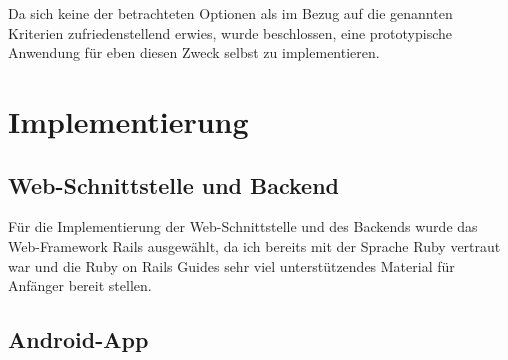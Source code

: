 \documentclass[11pt,utf8,notoc,bibnum,german,final]{zihpub}
\begin{document}
Da sich keine der betrachteten Optionen als im Bezug auf die genannten
Kriterien zufriedenstellend erwies, wurde beschlossen, eine prototypische
Anwendung für eben diesen Zweck selbst zu implementieren.

\section{Implementierung}

\subsection{Web-Schnittstelle und Backend}

Für die Implementierung der Web-Schnittstelle und des Backends wurde das
Web-Framework Rails \cite{rails} ausgewählt, da ich bereits mit der Sprache
Ruby vertraut war und die Ruby on Rails Guides \cite{rails-guides} sehr viel
unterstützendes Material für Anfänger bereit stellen.

\subsection{Android-App}
\end{document}
